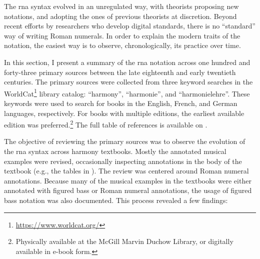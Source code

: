 

The \gls{rna} syntax evolved in an unregulated way, with
theorists proposing new notations, and adopting the ones of
previous theorists at discretion. Beyond recent efforts by
researchers who develop digital standards, there is no
``standard'' way of writing Roman numerals. In order to
explain the modern traits of the notation, the easiest way
is to observe, chronologically, its practice over time.

In this section, I present a summary of the \gls{rna}
notation across one hundred and forty-three primary sources
between the late eighteenth and early twentieth centuries.
The primary sources were collected from three keyword
searches in the
WorldCat\footnote{\href{https://www.worldcat.org/}{https://www.worldcat.org/}}
library catalog: ``harmony'', ``harmonie'', and
``harmonielehre''. These keywords were used to search for
books in the English, French, and German languages,
respectively. For books with multiple editions, the earliest
available edition was preferred.\footnote{Physically
available at the McGill Marvin Duchow Library, or digitally
available in e-book form.} The full table of references is
available on .



The objective of reviewing the primary sources was to
observe the evolution of the \gls{rna} syntax
across harmony textbooks. Mostly the annotated musical
examples were revised, occasionally inspecting annotations
in the body of the textbook (e.g., the tables in
\textcite{kirnberger1774kunst}). The review was centered
around Roman numeral annotations. Because many of the
musical examples in the textbooks were either annotated with
figured bass or Roman numeral annotations, the usage of
figured bass notation was also documented. This process
revealed a few findings:

